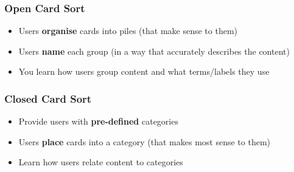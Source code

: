 \subsubsection{Open Card Sort}
\begin{itemize}
	\item Users \textbf{organise} cards into piles (that make sense to them)
	\item Users \textbf{name} each group (in a way that accurately describes the content)
	\item You learn how users group content and what terms/labels they use	
\end{itemize}

\subsubsection{Closed Card Sort}
\begin{itemize}
	\item Provide users with \textbf{pre-defined} categories
	\item Users \textbf{place} cards into a category (that makes most sense to them)
	\item Learn how users relate content to categories
\end{itemize}

